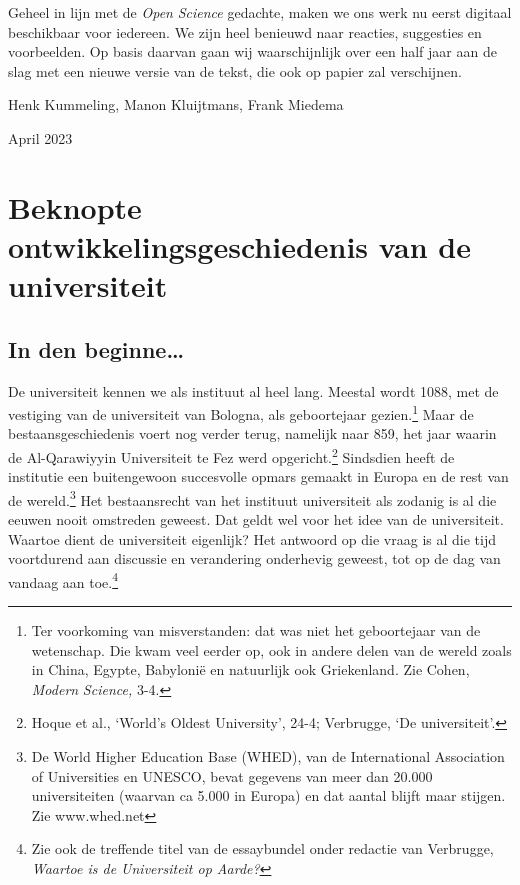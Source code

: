 \documentclass[smallauthor, chapterhaspagenum, nochapterinheader, pagenuminheader,  bigchapnum,medium2, tocpages, garamond, titleinheader]{jote-book}
\begin{document}
	Geheel in lijn met de \emph{Open }\emph{Science} gedachte, maken we ons werk nu eerst digitaal beschikbaar voor iedereen. We zijn heel benieuwd naar reacties, suggesties en voorbeelden. Op basis daarvan gaan wij waarschijnlijk over een half jaar aan de slag met een nieuwe versie van de tekst, die ook op papier zal verschijnen.



	\vspace*{\baselineskip}

	\noindent Henk Kummeling, Manon Kluijtmans, Frank Miedema

	\vspace*{\baselineskip}

	\noindent April 2023





	\chapter{Beknopte ontwikkelingsgeschiedenis van de universiteit }



	\section{In den beginne…}



	De universiteit kennen we als instituut al heel lang. Meestal wordt 1088, met de vestiging van de universiteit van Bologna, als geboortejaar gezien.\footnote{Ter voorkoming van misverstanden: dat was niet het geboortejaar van de wetenschap. Die kwam veel eerder op, ook in andere delen van de wereld zoals in China, Egypte, Babylonië en natuurlijk ook Griekenland. Zie Cohen, \emph{Modern }\emph{Science}\emph{,}\emph{ }3-4.} Maar de bestaansgeschiedenis voert nog verder terug, namelijk naar 859, het jaar waarin de Al-Qarawiyyin Universiteit te Fez werd opgericht.\footnote{Hoque et al., ‘World's Oldest University', 24-4; Verbrugge, ‘De universiteit'.} Sindsdien heeft de institutie een buitengewoon succesvolle opmars gemaakt in Europa en de rest van de wereld.\footnote{De World Higher Education Base (WHED), van de International Association of Universities en UNESCO, bevat gegevens van meer dan 20.000 universiteiten (waarvan ca 5.000 in Europa) en dat aantal blijft maar stijgen. Zie www.whed.net} Het bestaansrecht van het instituut universiteit als zodanig is al die eeuwen nooit omstreden geweest. Dat geldt wel voor het idee van de universiteit. Waartoe dient de universiteit eigenlijk? Het antwoord op die vraag is al die tijd voortdurend aan discussie en verandering onderhevig geweest, tot op de dag van vandaag aan toe.\footnote{Zie ook de treffende titel van de essaybundel onder redactie van Verbrugge, \emph{Waartoe is de Universiteit op Aarde}\emph{?}}
\end{document}
